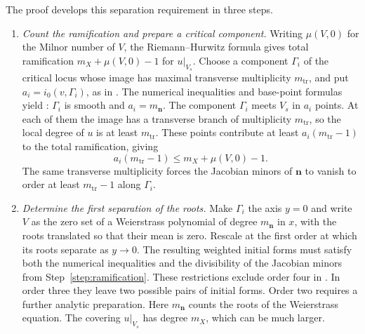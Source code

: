\documentclass[11pt,letterpaper]{article}
\numberwithin{equation}{section}
\theoremstyle{remark}
\theoremstyle{plain}
\begin{document}
The proof develops this separation requirement in three steps.
\begin{enumerate}
\item \label{step:ramification}
\emph{Count the ramification and prepare a critical component.}
Writing $\mu(V,0)$ for the Milnor number of $V$, the Riemann--Hurwitz
formula gives total ramification $m_X+\mu(V,0)-1$ for $u|_{V_s}$.
Choose a component $\Gamma_i$ of the critical locus whose image has
maximal transverse multiplicity $m_{\mathrm{tr}}$, and put
$a_i=i_0(v,\Gamma_i)$, as in .
The numerical inequalities and base-point formulas yield
: $\Gamma_i$ is smooth and
$a_i=m_{\boldsymbol n}$.
The component $\Gamma_i$ meets $V_s$ in $a_i$ points.  At each of them
the image has a transverse branch of multiplicity $m_{\mathrm{tr}}$,
so the local degree of $u$ is at least $m_{\mathrm{tr}}$.
These points contribute at least $a_i(m_{\mathrm{tr}}-1)$ to the
total ramification, giving
\[
 a_i(m_{\mathrm{tr}}-1)\leq m_X+\mu(V,0)-1.
\]
The same transverse multiplicity forces the Jacobian minors of
$\boldsymbol n$ to vanish to order at least $m_{\mathrm{tr}}-1$
along $\Gamma_i$.

\item \label{step:root-separation}
\emph{Determine the first separation of the roots.}
Make $\Gamma_i$ the axis $y=0$ and write $V$ as the zero set of a
Weierstrass polynomial of degree $m_{\boldsymbol n}$ in $x$, with the
roots translated so that their mean is zero.  Rescale at the first order
at which its roots separate as $y\to0$.  The resulting weighted
initial forms must satisfy both the numerical inequalities and
the divisibility of the Jacobian minors from
Step~\ref{step:ramification}.  These restrictions exclude order four
in .  In order three they leave two possible pairs
of initial forms.  Order two requires a further analytic preparation.
Here $m_{\boldsymbol n}$ counts the roots of the Weierstrass equation.  The covering
$u|_{V_s}$ has degree $m_X$, which can be much larger.


\end{enumerate}
\end{document}
